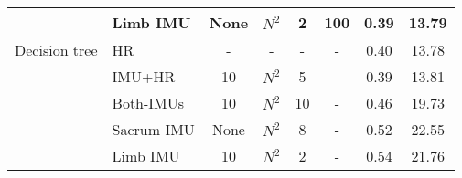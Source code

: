 \begin{table}[htbp]
{\begin{tabular}{llcccccc}
        ~ & Limb IMU & None & $N^2$  & 2  & 100  & 0.39  & 13.79  \\ \hline
        Decision tree & HR & - & -  & -  & -  & 0.40  & 13.78  \\ 
        ~ & IMU+HR & 10 & $N^2$  & 5  & -  & 0.39  & 13.81  \\ 
        ~ & Both-IMUs & 10 & $N^2$  & 10  & -  & 0.46  & 19.73  \\ 
        ~ & Sacrum IMU & None & $N^2$  & 8  & -  & 0.52  & 22.55  \\ 
        ~ & Limb IMU & 10 & $N^2$  & 2  & -  & 0.54  & 21.76  \\ \bottomrule
    \end{tabular}}
    \label{results_fatigue_chap}
\end{table}